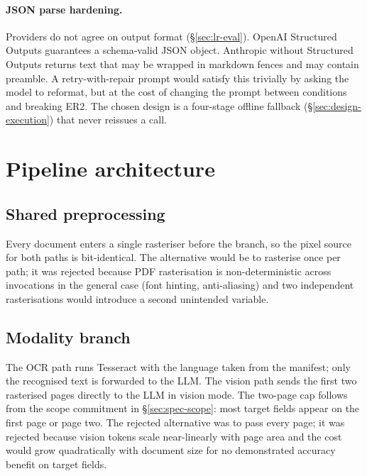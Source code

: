 \paragraph{JSON parse hardening.} Providers do not agree on output
format (\S\ref{sec:lr-eval}). OpenAI Structured Outputs guarantees
a schema-valid JSON object. Anthropic without Structured Outputs
returns text that may be wrapped in markdown fences and may contain
preamble. A retry-with-repair prompt would satisfy this trivially
by asking the model to reformat, but at the cost of changing the
prompt between conditions and breaking ER2. The chosen design is
a four-stage offline fallback (\S\ref{sec:design-execution}) that
never reissues a call.

\section{Pipeline architecture}
\label{sec:design-pipeline}

\subsection{Shared preprocessing}
\label{sec:design-pipeline-preproc}

Every document enters a single rasteriser before the branch, so the
pixel source for both paths is bit-identical. The alternative would
be to rasterise once per path; it was rejected because PDF
rasterisation is non-deterministic across invocations in the
general case (font hinting, anti-aliasing) and two independent
rasterisations would introduce a second unintended variable.

\subsection{Modality branch}

The OCR path runs Tesseract with the language taken from the
manifest; only the recognised text is forwarded to the LLM. The
vision path sends the first two rasterised pages directly to the
LLM in vision mode. The two-page cap follows from the scope
commitment in \S\ref{sec:spec-scope}: most target fields appear on
the first page or page two. The rejected alternative was to pass
every page; it was rejected because vision tokens scale
near-linearly with page area and the cost would grow quadratically
with document size for no demonstrated accuracy benefit on target
fields.

